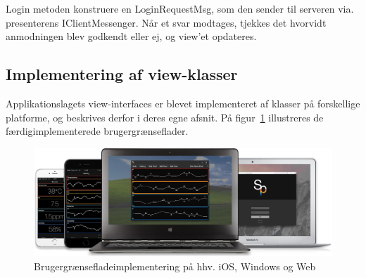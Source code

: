 Login metoden konstruere en LoginRequestMsg, som den sender til serveren via. presenterens IClientMessenger. Når et svar modtages, tjekkes det hvorvidt anmodningen blev godkendt eller ej, og view'et opdateres.

\subsection{Implementering af view-klasser}
Applikationslagets view-interfaces er blevet implementeret af klasser på forskellige platforme, og beskrives derfor i deres egne afsnit. På figur~\ref{fig:view_family} illustreres de færdigimplementerede brugergrænseflader. 

\begin{figure}
	\centering
	\includegraphics[width=1.0\linewidth]{figs/implementering/view_family}
	\caption{Brugergrænsefladeimplementering på hhv. iOS, Windows og Web}
	\label{fig:view_family}
\end{figure}